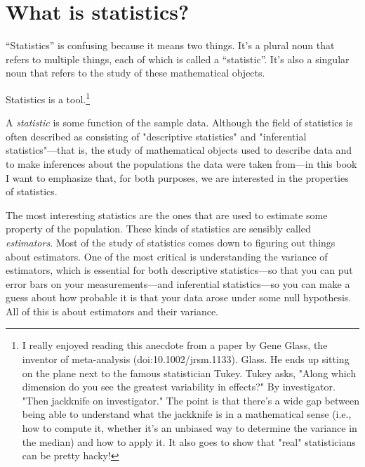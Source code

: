 
\chapter{What is statistics?}

``Statistics'' is confusing because it means two things. It's a plural noun that
refers to multiple things, each of which is called a ``statistic''. It's also a
singular noun that refers to the study of these mathematical objects.

Statistics is a tool.\footnote{I really enjoyed reading this anecdote from a
paper by Gene Glass, the inventor of meta-analysis (doi:10.1002/jrsm.1133).
Glass. He ends up sitting on the plane next to the famous statistician
Tukey. Tukey asks, "Along which dimension do you see the greatest
variability in effects?" By investigator. "Then jackknife on investigator."
The point is that there's a wide gap between being able to understand what
the jackknife is in a mathematical sense (i.e., how to compute it, whether
it's an unbiased way to determine the variance in the median) and how to apply
it. It also goes to show that "real" statisticians can be pretty hacky!}

A \emph{statistic} is some function of the sample data. Although the field of
statistics is often described as consisting of "descriptive statistics" and
"inferential statistics"---that is, the study of mathematical objects used to
describe data and to make inferences about the populations the data were taken
from---in this book I want to emphasize that, for both purposes, we are
interested in the properties of statistics.

The most interesting statistics are the ones that are used to estimate some
property of the population. These kinds of statistics are sensibly called
\emph{estimators}. Most of the study of statistics comes down to figuring out things
about estimators. One of the most critical is understanding the variance of
estimators, which is essential for both descriptive statistics---so that you
can put error bars on your measurements---and inferential statistics---so you
can make a guess about how probable it is that your data arose under some null
hypothesis. All of this is about estimators and their variance.